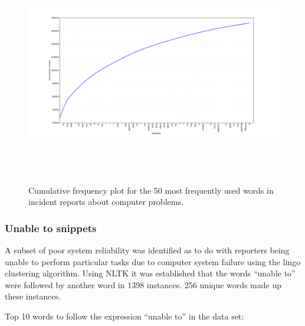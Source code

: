 \begin{figure}[htp]
\centering
\includegraphics[width=15cm,height=10cm]{figs/cummulativedistribution.png}
\caption{Cumulative frequency plot for the 50 most frequently used words in incident reports about computer problems.}\label{fig:cumulativedistribution}
 \end{figure}



\subsubsection{Unable to snippets}
\label{unabletosnippetsresults}
A subset of poor system reliability was identified as to do with reporters being unable to perform particular tasks due to computer system failure using the lingo clustering algorithm. Using NLTK it was established that the words ``unable to'' were followed by another word in 1398 instances. 256 unique words made up these instances.

Top 10 words to follow the expression ``unable to'' in the data set:
\begin{pyverbatim}
\end{pyverbatim}

